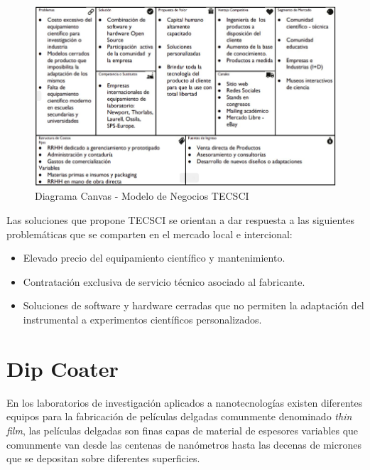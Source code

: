 \vspace{1cm}
\begin{figure}[htpb]
\centering 
\includegraphics[width=1\textwidth]{./Figures/canvas.png}
\caption{Diagrama Canvas - Modelo de Negocios TECSCI}
\label{fig:diagBloques}
\end{figure}
\vspace{1cm}


Las soluciones que propone TECSCI se orientan a dar respuesta a las siguientes problemáticas que se comparten en el mercado local e intercional:
\begin{itemize}
\item Elevado precio del equipamiento científico y mantenimiento.
\item Contratación exclusiva de servicio técnico asociado al fabricante.
\item Soluciones de software y hardware cerradas que no permiten la adaptación del instrumental a experimentos científicos personalizados.
\end{itemize}


\section{Dip Coater}


En los laboratorios de investigación aplicados a nanotecnologías existen diferentes equipos para la fabricación de películas delgadas comunmente denominado \textit{thin film}, las películas delgadas son finas capas de material de espesores variables que comunmente van desde las centenas de nanómetros hasta las decenas de micrones que se depositan sobre diferentes superficies.  

